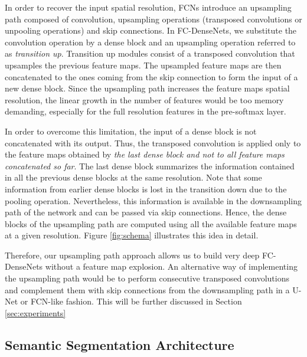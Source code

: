 \documentclass[10pt,twocolumn,letterpaper]{article}
\begin{document}
In order to recover the input spatial resolution, FCNs introduce an upsampling path composed of convolution, upsampling operations (transposed convolutions or unpooling operations) and skip connections. In FC-DenseNets, we substitute the convolution operation by a dense block and an upsampling operation referred to as \emph{transition up}. Transition up modules consist of a transposed convolution that upsamples the previous feature maps. The upsampled feature maps are then concatenated to the ones coming from the skip connection to form the input of a new dense block. Since the upsampling path increases the feature maps spatial resolution, the linear growth in the number of features would be too memory demanding, especially for the full resolution features in the pre-softmax layer.

In order to overcome this limitation, the input of a dense block is not concatenated with its output. Thus, the transposed convolution is applied only to the feature maps obtained by \emph{the last dense block and not to all feature maps concatenated so far}. The last dense block summarizes the information contained in all the previous dense blocks at the same resolution. Note that some information from earlier dense blocks is lost in the transition down due to the pooling operation. Nevertheless, this information is available in the downsampling path of the network and can be passed via skip connections. Hence, the dense blocks of the upsampling path are computed using all the available feature maps at a given resolution. Figure \ref{fig:schema} illustrates this idea in detail. 


Therefore, our upsampling path approach allows us to build very deep FC-DenseNets without a feature map explosion. An alternative way of implementing the upsampling path would be to perform consecutive transposed convolutions and complement them with skip connections from the downsampling path in a U-Net \cite{ronneberger2015u} or FCN-like \cite{long2015fully} fashion. This will be further discussed in Section \ref{sec:experiments}


\subsection{Semantic Segmentation Architecture}
\label{ssec:architecture}
\end{document}
